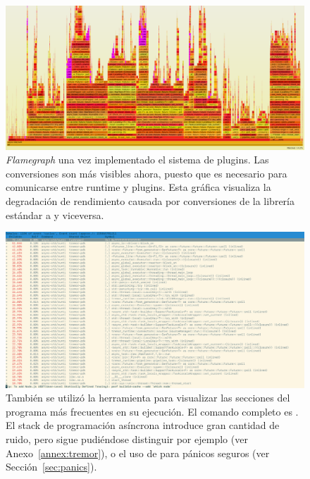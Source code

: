 \begin{figure}
    \centering
    \includegraphics[width=\textwidth]{./Imagenes/with_value_conv.png}
    \caption{\emph{Flamegraph} una vez implementado el sistema de plugins. Las
    conversiones son más visibles ahora, puesto que es necesario para
    comunicarse entre runtime y plugins. Esta gráfica visualiza la degradación
    de rendimiento causada por conversiones de la librería estándar a \abistable
    y viceversa.}%
    \label{fig:with_value_conv}
\end{figure}

\begin{figure}
    \centering
    \includegraphics[width=\textwidth]{./Imagenes/perf_report.png}
    \caption{También se utilizó la herramienta  para visualizar las
    secciones del programa más frecuentes en su ejecución. El comando completo
    es . El stack de programación
    asíncrona introduce gran cantidad de ruido, pero sigue pudiéndose distinguir
    por ejemplo  (ver Anexo~\ref{annex:tremor}), o el uso
    de  para pánicos seguros (ver
    Sección~\ref{sec:panics}).}%
    \label{fig:perf}
\end{figure}

